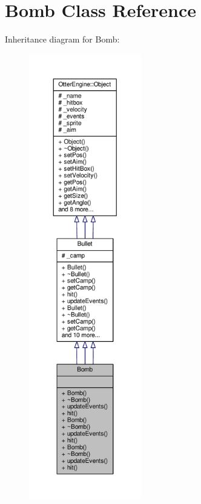 \hypertarget{class_bomb}{}\section{Bomb Class Reference}
\label{class_bomb}


Inheritance diagram for Bomb\+:\nopagebreak
\begin{figure}[H]
\begin{center}
\leavevmode
\includegraphics[height=550pt]{d1/d77/class_bomb__inherit__graph}
\end{center}
\end{figure}



